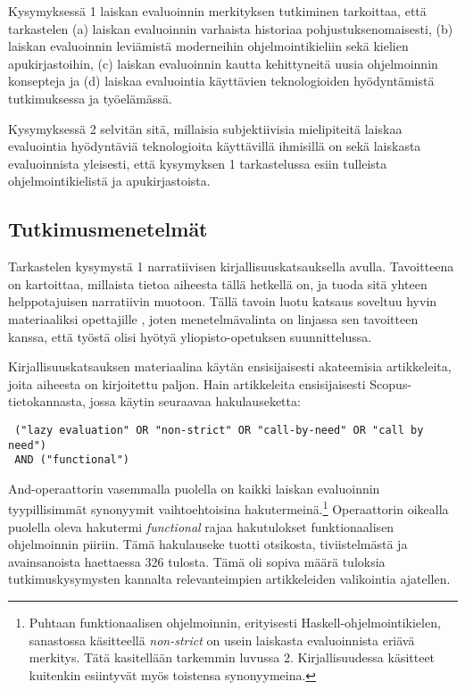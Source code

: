 Kysymyksessä 1 laiskan evaluoinnin merkityksen tutkiminen tarkoittaa, että tarkastelen (a) laiskan evaluoinnin varhaista historiaa pohjustuksenomaisesti, (b) laiskan evaluoinnin leviämistä moderneihin ohjelmointikieliin sekä kielien apukirjastoihin, (c) laiskan evaluoinnin kautta kehittyneitä uusia ohjelmoinnin konsepteja ja (d) laiskaa evaluointia käyttävien teknologioiden hyödyntämistä tutkimuksessa ja työelämässä.

Kysymyksessä 2 selvitän sitä, millaisia subjektiivisia mielipiteitä laiskaa evaluointia hyödyntäviä teknologioita käyttävillä ihmisillä on sekä laiskasta evaluoinnista yleisesti, että kysymyksen 1 tarkastelussa esiin tulleista ohjelmointikielistä ja apukirjastoista.


\subsection{Tutkimusmenetelmät}

Tarkastelen kysymystä 1 narratiivisen kirjallisuuskatsauksella avulla. Tavoitteena on kartoittaa, millaista tietoa aiheesta tällä hetkellä on, ja tuoda sitä yhteen helppotajuisen narratiivin muotoon. Tällä tavoin luotu katsaus soveltuu hyvin materiaaliksi opettajille \citep[s. 312]{baumeister1997writing}, joten menetelmävalinta on linjassa sen tavoitteen kanssa, että työstä olisi hyötyä yliopisto-opetuksen suunnittelussa.

Kirjallisuuskatsauksen materiaalina käytän ensisijaisesti akateemisia artikkeleita, joita aiheesta on kirjoitettu paljon. Hain artikkeleita ensisijaisesti Scopus-tietokannasta, jossa käytin seuraavaa hakulauseketta:

\begin{verbatim}
 ("lazy evaluation" OR "non-strict" OR "call-by-need" OR "call by need")
 AND ("functional")
\end{verbatim}

And-operaattorin vasemmalla puolella on kaikki laiskan evaluoinnin tyypillisimmät synonyymit vaihtoehtoisina hakutermeinä.\footnote{Puhtaan funktionaalisen ohjelmoinnin, erityisesti Haskell-ohjelmointikielen, sanastossa käsitteellä \textit{non-strict} on usein laiskasta evaluoinnista eriävä merkitys. Tätä kasitellään tarkemmin luvussa 2. Kirjallisuudessa käsitteet kuitenkin esiintyvät myös toistensa synonyymeina.} Operaattorin oikealla puolella oleva hakutermi \textit{functional} rajaa hakutulokset funktionaalisen ohjelmoinnin piiriin. Tämä hakulauseke tuotti otsikosta, tiviistelmästä ja avainsanoista haettaessa 326 tulosta. Tämä oli sopiva määrä tuloksia tutkimuskysymysten kannalta relevanteimpien artikkeleiden valikointia ajatellen.

